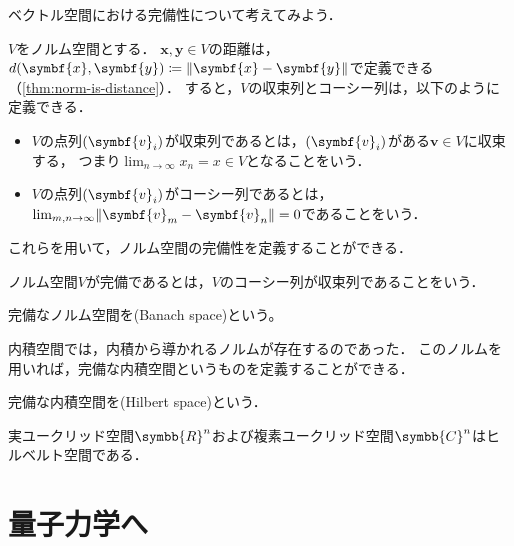 \documentclass{sotsu}
\begin{document}
ベクトル空間における完備性について考えてみよう．

$V$をノルム空間とする．
$\symbf{x}, \symbf{y} \in V$の距離は，
$d(\symbf{x}, \symbf{y}) \coloneq \norm{\symbf{x} - \symbf{y}}$で定義できる（\cref{thm:norm-is-distance}）．
すると，$V$の収束列とコーシー列は，以下のように定義できる．
\begin{itemize}
    \item $V$の点列$\sequ{\symbf{v}_i}$が収束列であるとは，$\sequ{\symbf{v}_i}$がある$\symbf{v} \in V$に収束する，
        つまり$\lim_{n \to \infty} x_n = x \in V$となることをいう．
    \item $V$の点列$\sequ{\symbf{v}_i}$がコーシー列であるとは，
        $\lim_{m, n \to \infty} \norm{\symbf{v}_m - \symbf{v}_n} = 0$であることをいう．
\end{itemize}
これらを用いて，ノルム空間の完備性を定義することができる．

\begin{definition}
    ノルム空間$V$が完備であるとは，$V$のコーシー列が収束列であることをいう．
\end{definition}

\begin{definition}[バナッハ空間]
    \label{dfn:Banach-space}
    完備なノルム空間を(Banach space)という。
\end{definition}

内積空間では，内積から導かれるノルムが存在するのであった．
このノルムを用いれば，完備な内積空間というものを定義することができる．

\begin{definition}[ヒルベルト空間]
    \label{dfn:Hilbert-space}
    完備な内積空間を(Hilbert space)という．
\end{definition}

\begin{proposition}
    実ユークリッド空間$\symbb{R}^n$および複素ユークリッド空間$\symbb{C}^n$はヒルベルト空間である．
\end{proposition}






\chapter{量子力学へ}


\end{document}
